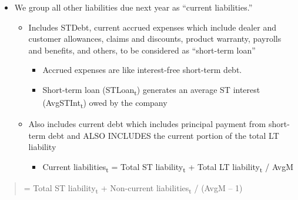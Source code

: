 \documentclass[12pt,a4paper]{article}
\begin{document}
\begin{itemize}
\item
  We group all other liabilities due next year as ``current
  liabilities.''

  \begin{itemize}
  \item
    Includes STDebt, current accrued expenses which include dealer and
    customer allowances, claims and discounts, product warranty,
    payrolls and benefits, and others, to be considered as ``short-term
    loan''

    \begin{itemize}
    \item
      Accrued expenses are like interest-free short-term debt.
    \item
      Short-term loan (STLoan\textsubscript{t}) generates an average ST
      interest (AvgSTInt\textsubscript{t}) owed by the company
    \end{itemize}
  \item
    Also includes current debt which includes principal payment from
    short-term debt and ALSO INCLUDES the current portion of the total
    LT liability

    \begin{itemize}
    \item
      Current liabilities\textsubscript{t} = Total ST
      liability\textsubscript{t} + Total LT liability\textsubscript{t} /
      AvgM
    \end{itemize}
  \end{itemize}
\end{itemize}

\begin{quote}
= Total ST liability\textsubscript{t} + Non-current
liabilities\textsubscript{t} / (AvgM -- 1)
\end{quote}
\end{document}
